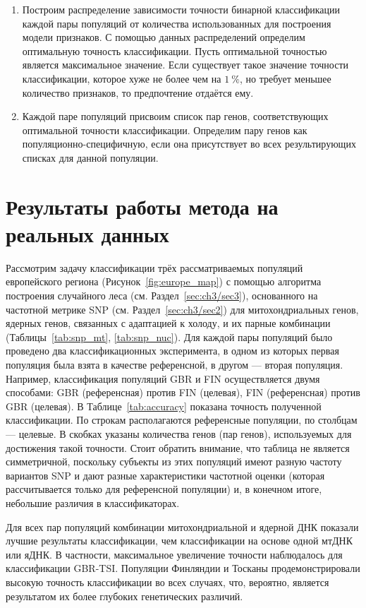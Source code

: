 \begin{enumerate}
	\item Построим распределение зависимости точности бинарной классификации каждой пары популяций от количества использованных для построения модели признаков. С помощью данных распределений определим оптимальную точность классификации. Пусть оптимальной точностью является максимальное значение. Если существует такое значение точности классификации, которое хуже не более чем на $1~\%$, но требует меньшее количество признаков, то предпочтение отдаётся ему.
	\item Каждой паре популяций присвоим список пар генов, соответствующих оптимальной точности классификации. Определим пару генов как популяционно-специфичную, если она присутствует во всех результирующих списках для данной популяции.
\end{enumerate}

\section{Результаты работы метода на реальных данных}\label{sec:ch3/sec4}

Рассмотрим задачу классификации трёх рассматриваемых популяций европейского региона (Рисунок~\ref{fig:europe_map}) с помощью алгоритма построения случайного леса (см. Раздел~\ref{sec:ch3/sec3}), основанного на частотной метрике SNP (см. Раздел~\ref{sec:ch3/sec2}) для митохондриальных генов, ядерных генов, связанных с адаптацией к холоду, и их парные комбинации (Таблицы~\ref{tab:snp_mt}, \ref{tab:snp_nuc}). Для каждой пары популяций было проведено два классификационных эксперимента, в одном из которых первая популяция была взята в качестве референсной, в другом --- вторая популяция. Например, классификация популяций GBR и FIN осуществляется двумя способами: GBR (референсная) против FIN (целевая), FIN (референсная) против GBR (целевая). В Таблице~\ref{tab:accuracy} показана точность полученной классификации. По строкам располагаются референсные популяции, по столбцам --- целевые. В скобках указаны количества генов (пар генов), используемых для достижения такой точности. Стоит обратить внимание, что таблица не является симметричной, поскольку субъекты из этих популяций имеют разную частоту вариантов SNP и дают разные характеристики частотной оценки (которая рассчитывается только для референсной популяции) и, в конечном итоге, небольшие различия в классификаторах.

Для всех пар популяций комбинации митохондриальной и ядерной ДНК показали лучшие результаты классификации, чем классификации на основе одной мтДНК или яДНК. В частности, максимальное увеличение точности наблюдалось для классификации GBR-TSI. Популяции Финляндии и Тосканы продемонстрировали высокую точность классификации во всех случаях, что, вероятно, является результатом их более глубоких генетических различий.

